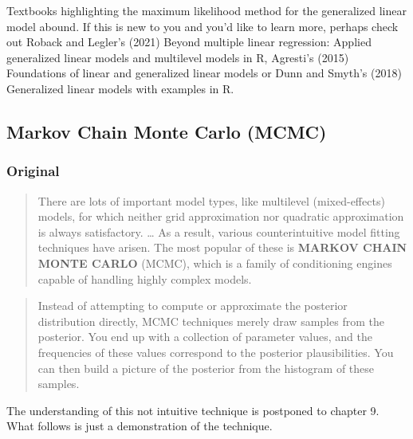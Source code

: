 \documentclass[
  letterpaper,
  DIV=11,
  numbers=noendperiod]{scrreprt}
\begin{document}
Textbooks highlighting the maximum likelihood method for the generalized
linear model abound. If this is new to you and you'd like to learn more,
perhaps check out Roback and Legler's (2021) Beyond multiple linear
regression: Applied generalized linear models and multilevel models in
R, Agresti's (2015) Foundations of linear and generalized linear models
or Dunn and Smyth's (2018) Generalized linear models with examples in R.

\hypertarget{markov-chain-monte-carlo-mcmc}{%
\subsection{Markov Chain Monte Carlo
(MCMC)}\label{markov-chain-monte-carlo-mcmc}}

\hypertarget{original-8}{%
\subsubsection{Original}\label{original-8}}

\begin{quote}
There are lots of important model types, like multilevel (mixed-effects)
models, for which neither grid approximation nor quadratic approximation
is always satisfactory. \ldots{} As a result, various counterintuitive
model fitting techniques have arisen. The most popular of these is
\textbf{MARKOV CHAIN MONTE CARLO} (MCMC), which is a family of
conditioning engines capable of handling highly complex models.
\end{quote}

\begin{quote}
Instead of attempting to compute or approximate the posterior
distribution directly, MCMC techniques merely draw samples from the
posterior. You end up with a collection of parameter values, and the
frequencies of these values correspond to the posterior plausibilities.
You can then build a picture of the posterior from the histogram of
these samples.
\end{quote}

The understanding of this not intuitive technique is postponed to
chapter 9. What follows is just a demonstration of the technique.
\end{document}

